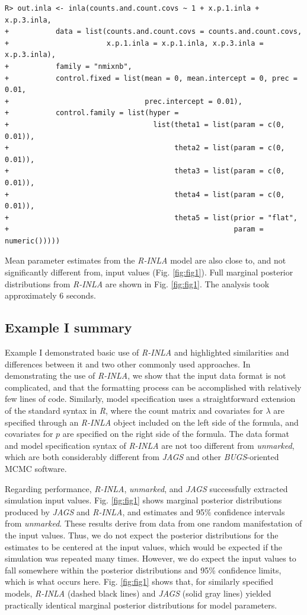 \documentclass{article}
\begin{document}
\begin{verbatim}
R> out.inla <- inla(counts.and.count.covs ~ 1 + x.p.1.inla + x.p.3.inla,
+           data = list(counts.and.count.covs = counts.and.count.covs,
+                       x.p.1.inla = x.p.1.inla, x.p.3.inla = x.p.3.inla),
+           family = "nmixnb",
+           control.fixed = list(mean = 0, mean.intercept = 0, prec = 0.01,
+                                prec.intercept = 0.01),
+           control.family = list(hyper = 
+                                  list(theta1 = list(param = c(0, 0.01)),
+                                       theta2 = list(param = c(0, 0.01)),
+                                       theta3 = list(param = c(0, 0.01)),
+                                       theta4 = list(param = c(0, 0.01)),
+                                       theta5 = list(prior = "flat",
+                                                     param = numeric()))))
\end{verbatim}

Mean parameter estimates from the \emph{R-INLA} model are also close to, and not significantly different from, input values (Fig. \ref{fig:fig1}). Full marginal posterior distributions from \emph{R-INLA} are shown in Fig. \ref{fig:fig1}. The analysis took approximately 6 seconds.

\subsection[Example I summary]{Example I summary}
Example I demonstrated basic use of \emph{R-INLA} and highlighted similarities and differences between it and two other commonly used approaches. In demonstrating the use of \emph{R-INLA}, we show that the input data format is not complicated, and that the formatting process can be accomplished with relatively few lines of code. Similarly, model specification uses a straightforward extension of the standard syntax in \emph{R}, where the count matrix and covariates for $\lambda$ are specified through an \emph{R-INLA} object included on the left side of the formula, and covariates for $p$ are specified on the right side of the formula. The data format and model specification syntax of \emph{R-INLA} are not too different from \emph{unmarked}, which are both considerably different from \emph{JAGS} and other \emph{BUGS}-oriented MCMC software.

Regarding performance, \emph{R-INLA}, \emph{unmarked}, and \emph{JAGS} successfully extracted simulation input values. Fig. \ref{fig:fig1} shows marginal posterior distributions produced by \emph{JAGS} and \emph{R-INLA}, and estimates and 95\% confidence intervals from \emph{unmarked}. These results derive from data from one random manifestation of the input values. Thus, we do not expect the posterior distributions for the estimates to be centered at the input values, which would be expected if the simulation was repeated many times. However, we do expect the input values to fall somewhere within the posterior distributions and 95\% confidence limits, which is what occurs here.  Fig. \ref{fig:fig1} shows that, for similarly specified models, \emph{R-INLA} (dashed black lines) and \emph{JAGS} (solid gray lines) yielded practically identical marginal posterior distributions for model parameters.
\end{document}
